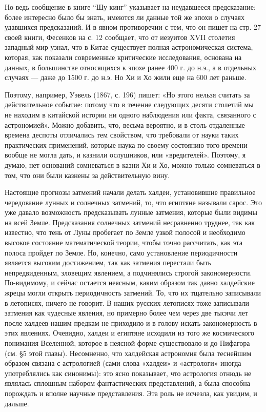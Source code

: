Но  ведь  сообщение  в  книге ``Шу  кинг''  указывает  на  неудавшееся
предсказание: более интересно было бы  знать, имеются ли данные той же
эпохи  о случаях  удавшихся  предсказаний. И  в  явном противоречии  с
тем,  что  он  пишет  на  стр.  27 своей  книги,  Фесенков  на  с.  12
сообщает,  что  от иезуитов  XVII  столетия  западный мир  узнал,  что
в  Китае  существует  полная  астрономическая  система,  которая,  как
показали современные  критические исследования, основана на  данных, в
большинстве относящихся  к эпохе ранее 400  г. до н.э., а  в отдельных
случаях ---  даже до 1500 г.  до н.э. Но Хи  и Хо жили еще  на 600 лет
раньше.

Поэтому,  например, Уэвель  (1867,  с. 196)  пишет:  «Но этого  нельзя
считать  за действительное  событие:  потому что  в течение  следующих
десяти столетий мы не находим в китайской истории ни одного наблюдения
или  факта, связанного  с  астрономией». Можно  добавить, что,  весьма
вероятно,  и  в  столь   отдаленные  времена  деспоты  отличались  тем
свойством,  что  требовали  от науки  таких  практических  применений,
которые наука по своему состоянию того времени вообще не могла дать, и
казнили ослушников, или «вредителей».  Поэтому, я думаю, нет оснований
сомневаться в казни  Хи и Хо, можно только сомневаться  в том, что они
были казнены за действительную вину.

Настоящие  прогнозы   затмений  начали  делать   халдеи,  установившие
правильное чередование  лунных и солнечных затмений,  то, что египтяне
называли  сарос.  Это  уже  давало  возможность  предсказывать  лунные
затмения, которые  были видимы  на всей Земле.  Предсказания солнечных
затмений  несравненно труднее,  так  как известно,  что  тень от  Луны
пробегает  по  Земле  узкой  полосой и  необходимо  высокое  состояние
математической теории, чтобы точно  рассчитать, как эта полоса пройдет
по  Земле.  Но,  конечно,  само  установление  периодичности  является
высоким достижением,  так как затмения перестали  быть непредвиденным,
зловещим явлением, а  подчинялись строгой закономерности. По-видимому,
и сейчас  остается неясным, каким  образом так давно  халдейские жрецы
могли открыть периодичность затмений.  То, что их тщательно записывали
в  летописях,  ничего  не  говорит. В  наших  русских  летописях  тоже
записывали затмения как чудесные явления,  но примерно более чем через
две тысячи  лет после халдеев  нашим предкам  не приходило и  в голову
искать  закономерность в  этих явлениях.  Очевидно, халдеи  и египтяне
исходили  из  того  же  космического понимания  Вселенной,  которое  в
неясной  форме  существовало  и  до  Пифагора  (см.  §5  этой  главы).
Несомненно, что халдейская астрономия была теснейшим образом связана с
астрологией (сами  слова «халдеи»  и «астрологи»  иногда употреблялись
как синонимы): это ясно показывает,  что астрология отнюдь не являлась
сплошным  набором   фантастических  представлений,  а   была  способна
порождать и  вполне научные  представления. Эта  роль не  исчезла, как
увидим, и дальше.

